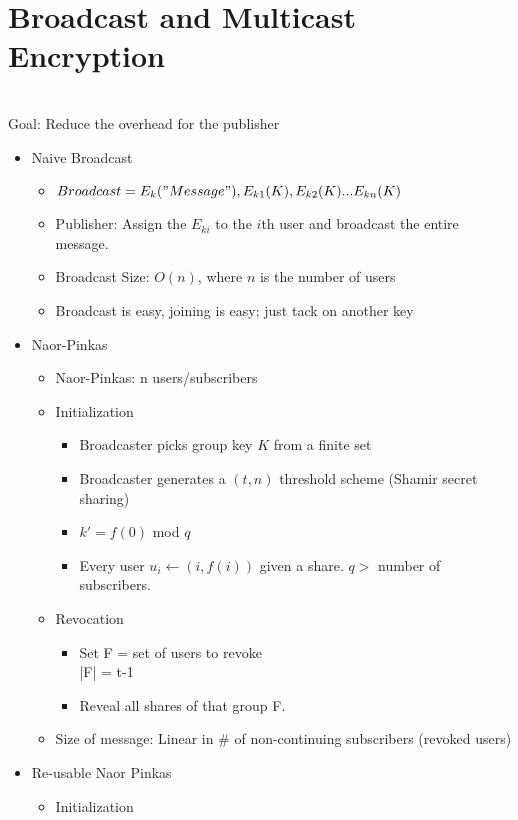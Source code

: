 \section{Broadcast and Multicast Encryption}
\\Goal: Reduce the overhead for the publisher
\begin{itemize}
\item Naive Broadcast
    \begin{itemize}
    \item $Broadcast = E_k("Message"), E_{k1}(K), E_{k2}(K) ... E_{kn}(K)$
    \item Publisher: Assign the $E_{ki}$ to the $i$th user and broadcast the entire message.
    \item Broadcast Size: $O(n)$, where $n$ is the number of users
    \item Broadcast is easy, joining is easy; just tack on another key
    \end{itemize}
\item Naor-Pinkas
    \begin{itemize}
    \item Naor-Pinkas: n users/subscribers
    \item Initialization
        \begin{itemize}
        \item Broadcaster picks group key $K$ from a finite set
        \item Broadcaster generates a $(t,n)$ threshold scheme (Shamir secret sharing)
        \item $k' = f(0)$ mod $q$
        \item Every user $u_i \leftarrow (i,f(i))$ given a share. $q > $ number of subscribers.
        \end{itemize}
    \item Revocation
        \begin{itemize}
        \item Set F = set of users to revoke
        \\|F| = t-1
        \item Reveal all shares of that group F. 
        \end{itemize}
    \item Size of message: Linear in # of non-continuing subscribers (revoked users)
    \end{itemize}
\item Re-usable Naor Pinkas
    \begin{itemize}
    \item Initialization

\end{itemize}
\end{itemize}
